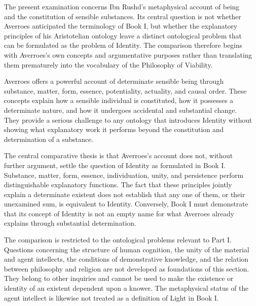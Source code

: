 \label{para:VS.B01.P01.C08.S15.SS01.P001}

The present examination concerns Ibn Rushd's metaphysical account of
being and the constitution of sensible substances. Its central
question is not whether Averroes anticipated the terminology of
Book I, but whether the explanatory principles of his Aristotelian
ontology leave a distinct ontological problem that can be formulated
as the problem of Identity. The comparison therefore begins with
Averroes's own concepts and argumentative purposes rather than
translating them prematurely into the vocabulary of the Philosophy
of Viability.

\label{para:VS.B01.P01.C08.S15.SS01.P002}

Averroes offers a powerful account of determinate sensible being
through substance, matter, form, essence, potentiality, actuality,
and causal order. These concepts explain how a sensible individual
is constituted, how it possesses a determinate nature, and how it
undergoes accidental and substantial change. They provide a serious
challenge to any ontology that introduces Identity without showing
what explanatory work it performs beyond the constitution and
determination of a substance.

\label{para:VS.B01.P01.C08.S15.SS01.P003}

The central comparative thesis is that Averroes's account does not,
without further argument, settle the question of Identity as
formulated in Book I. Substance, matter, form, essence, individuation,
unity, and persistence perform distinguishable explanatory functions.
The fact that these principles jointly explain a determinate existent
does not establish that any one of them, or their unexamined sum,
is equivalent to Identity. Conversely, Book I must demonstrate that
its concept of Identity is not an empty name for what Averroes
already explains through substantial determination.

\label{para:VS.B01.P01.C08.S15.SS01.P004}

The comparison is restricted to the ontological problems relevant
to Part I. Questions concerning the structure of human cognition,
the unity of the material and agent intellects, the conditions of
demonstrative knowledge, and the relation between philosophy and
religion are not developed as foundations of this section. They
belong to other inquiries and cannot be used to make the existence
or identity of an existent dependent upon a knower. The metaphysical
status of the agent intellect is likewise not treated as a
definition of Light in Book I.


